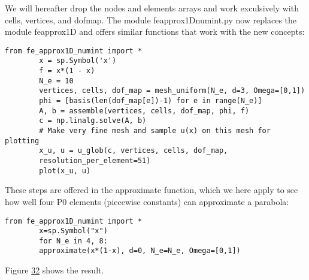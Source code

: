 \documentclass[../main.tex]{subfiles}
\begin{document}
	We will hereafter drop the nodes and elements arrays and work exculsively
	with cells, vertices, and dof\textunderscore map. The module fe\textunderscore approx1D\textunderscore numint.py
	now replaces the module fe\textunderscore approx1D and offers similar functions that work
	with the new concepts:
	\begin{lstlisting}[numbers=none]
		from fe_approx1D_numint import *
		x = sp.Symbol('x')
		f = x*(1 - x)
		N_e = 10
		vertices, cells, dof_map = mesh_uniform(N_e, d=3, Omega=[0,1])
		phi = [basis(len(dof_map[e])-1) for e in range(N_e)]
		A, b = assemble(vertices, cells, dof_map, phi, f)
		c = np.linalg.solve(A, b)
		# Make very fine mesh and sample u(x) on this mesh for plotting
		x_u, u = u_glob(c, vertices, cells, dof_map,
		resolution_per_element=51)
		plot(x_u, u)	
	\end{lstlisting}
	These steps are offered in the approximate function, which we here apply to see
	how well four P0 elements (piecewise constants) can approximate a parabola:
	\begin{lstlisting}[numbers=none]
		from fe_approx1D_numint import *
		x=sp.Symbol("x")
		for N_e in 4, 8:
		approximate(x*(1-x), d=0, N_e=N_e, Omega=[0,1])	
	\end{lstlisting}
	Figure \hyperref[fig:img_32]{32} shows the result.
	
\end{document}
